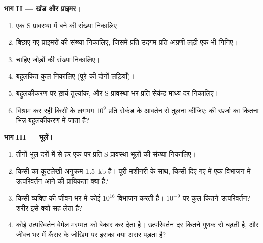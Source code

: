 \begin{problem}
\medskip
\noindent\textbf{भाग II --- खंड और प्राइमर।}
\begin{enumerate}[resume]
  \item एक S प्रावस्था में बने  की संख्या निकालिए।
  \item बिछाए गए  प्राइमरों की संख्या निकालिए, जिसमें प्रति उद्गम
        प्रति अग्रणी लड़ी एक भी गिनिए।
  \item चाहिए जोड़ों की संख्या निकालिए।
  \item बहुलकित कुल  निकालिए (पूरे  की दोनों
        लड़ियाँ)।
  \item बहुलकीकरण पर ख़र्च  तुल्यांक, और S प्रावस्था भर प्रति सेकंड
        माध्य दर निकालिए।
  \item विश्राम कर रही किसी  के लगभग $10^9$ प्रति सेकंड के 
        आवर्तन से तुलना कीजिए:  की ऊर्जा का कितना भिन्न
        बहुलकीकरण में जाता है?
\end{enumerate}

\medskip
\noindent\textbf{भाग III --- भूलें।}
\begin{enumerate}[resume]
  \item तीनों भूल-दरों में से हर एक पर प्रति S प्रावस्था भूलों की संख्या
        निकालिए।
  \item किसी  का कूटलेखी अनुक्रम \qty{1.5}{kb} है। पूरी मशीनरी के
        साथ, किसी दिए गए  में एक विभाजन में उत्परिवर्तन आने की
        प्रायिकता क्या है?
  \item किसी व्यक्ति की  जीवन भर में कोई $10^{16}$ विभाजन करती
        हैं। $10^{-9}$ पर कुल कितने उत्परिवर्तन? शरीर इसे क्यों सह लेता
        है?
  \item कोई उत्परिवर्तन बेमेल मरम्मत को बेकार कर देता है। उत्परिवर्तन
        दर कितने गुणक से चढ़ती है, और जीवन भर में कैंसर के जोखिम पर
        इसका क्या असर पड़ता है?
\end{enumerate}


\end{problem}
